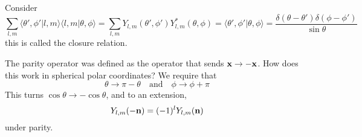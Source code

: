 \vspace{2ex}
\begin{cor}
Consider 
\[\sum _{l,m}\langle \theta',\phi '|l,m\rangle \langle l,m|\theta ,\phi \rangle = \sum _{l,m}Y_{l,m}(\theta ',\phi ')Y_{l,m}^{*}(\theta ,\phi )=\langle \theta ',\phi '|\theta ,\phi \rangle=\dfrac{\delta (\theta -\theta ')\delta(\phi -\phi ')}{\sin \theta } \]
this is called the closure relation.
\end{cor}
\vspace{2ex}
\begin{defi}
The parity operator was defined as the operator that sends ${\bf x}\rightarrow -{\bf x}$. How does this work in spherical polar coordinates? We require that
\[\theta \rightarrow \pi -\theta \quad\mathrm{and}\quad \phi \rightarrow \phi +\pi \]
This turns $\cos \theta \rightarrow -\cos \theta $, and to an extension,
\[Y_{l,m}(-{\bf n})=(-1)^{l}Y_{l,m}({\bf n})\]
under parity.
\end{defi}
\vspace{2ex}

